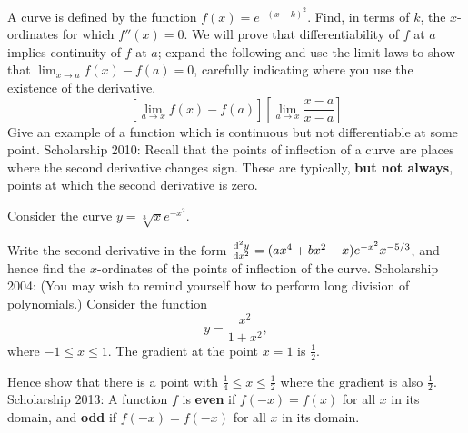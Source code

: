 \begin{questions}
  \questioE A curve is defined by the function $ f(x) = e^{-(x-k)^2} $. Find, in terms of $ k $, the $ x$-ordinates for which $ f''(x) = 0 $.
  \questioS We will prove that differentiability of $ f $ at $ a $ implies continuity of $ f $ at $ a $; expand the following
            and use the limit laws to show that $ \lim_{x \to a} f(x) - f(a) = 0 $, carefully indicating where you use the existence
            of the derivative.
            \begin{displaymath}
              \left[\lim_{a \to x} f(x) - f(a)\right]\left[\lim_{a \to x} \frac{x - a}{x - a}\right]
            \end{displaymath}
  \questioE Give an example of a function which is continuous but not differentiable at some point.
  \questioS Scholarship 2010: Recall that the points of inflection of a curve are places where the second derivative
            changes sign. These are typically, \textbf{but not always}, points at which the second derivative is zero.

            Consider the curve $ y = \sqrt[3]{x} e^{-x^2} $.

            Write the second derivative in the form $ \od[2]{y}{x} = (ax^4 + bx^2 + x)e^{-x^2} x^{-5/3} $, and hence
            find the $ x$-ordinates of the points of inflection of the curve.
  \questioS Scholarship 2004: (You may wish to remind yourself how to perform long division of polynomials.) Consider the function
            \begin{displaymath}
              y = \frac{x^2}{1 + x^2},
            \end{displaymath}
            where $ -1 \leq x \leq 1 $. The gradient at the point $ x = 1 $ is $ \frac{1}{2} $.

            Hence show that there is a point with $ \frac{1}{4} \leq x \leq \frac{1}{2} $ where the gradient is also $ \frac{1}{2} $.
  \questioS Scholarship 2013: A function $ f $ is \textbf{even} if $ f(-x) = f(x) $ for all $ x $ in its domain, and \textbf{odd} if $ f(-x) = f(-x) $
            for all $ x $ in its domain.
    \begin{parts}

\end{parts}
\end{questions}
